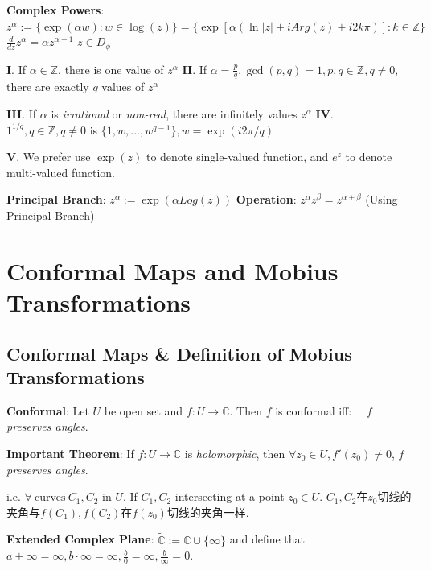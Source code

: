 \documentclass[9pt]{article}
\begin{document}
\textbf{Complex Powers}: $z^{\alpha}:=\{\exp(\alpha w):w\in\log(z)\}=\{\exp[\alpha(\ln|z|+iArg(z)+i2k\pi)]:k\in\mathbb{Z}\}$ \quad \qquad \qquad \qquad $\frac{d}{dz}z^\alpha=\alpha z^{\alpha-1}$ {\tiny $z\in D_{\phi}$}

\qquad\textbf{I}. If $\alpha\in\mathbb{Z}$, there is one value of $z^{\alpha}$ \quad \quad \textbf{II}. If $\alpha=\frac{p}{q},\gcd(p,q)=1,p,q\in\mathbb{Z},q\ne0$, there are exactly $q$ values of $z^{\alpha}$

\qquad\textbf{III}. If $\alpha$ is \textit{irrational} or \textit{non-real}, there are infinitely values $z^{\alpha}$ \quad \quad \textbf{IV}. $1^{1/q},q\in\mathbb{Z},q\ne0$ is $\{1,w,...,w^{q-1}\},w=\exp(i2\pi/q)$

\qquad\textbf{V}. We prefer use $\exp(z)$ to denote single-valued function, and $e^z$ to denote multi-valued function. 

\qquad\textbf{Principal Branch}: $z^{\alpha}:=\exp(\alpha Log(z))$ \qquad \qquad \textbf{Operation}: $z^{\alpha}z^{\beta}=z^{\alpha+\beta}$ {\footnotesize (Using Principal Branch)} 


\section{Conformal Maps and Mobius Transformations} %

\subsection{Conformal Maps \& Definition of Mobius Transformations} %

\textbf{Conformal}: Let $U$ be open set and $f:U\to\mathbb{C}$. Then $f$ is conformal iff: \ \ $f$ \textit{preserves angles}. 

\quad \textbf{Important Theorem}: If $f:U\to\mathbb{C}$ is \textit{holomorphic}, then $\forall z_0\in U,f'(z_0)\ne0$, $f$ \textit{preserves angles}.

\quad i.e. $\forall \ \text{curves} \ C_1,C_2$ in $U$. If $C_1,C_2$ intersecting at a point $z_0\in U$. {\scriptsize $C_1,C_2$在$z_0$切线的夹角与$f(C_1),f(C_2)$在$f(z_0)$切线的夹角一样.}

\textbf{Extended Complex Plane}: $\widetilde{\mathbb{C}}:=\mathbb{C}\cup\{\infty\}$ and define that $a+\infty=\infty,b\cdot\infty=\infty,\frac{b}{0}=\infty,\frac{b}{\infty}=0$.
\end{document}

